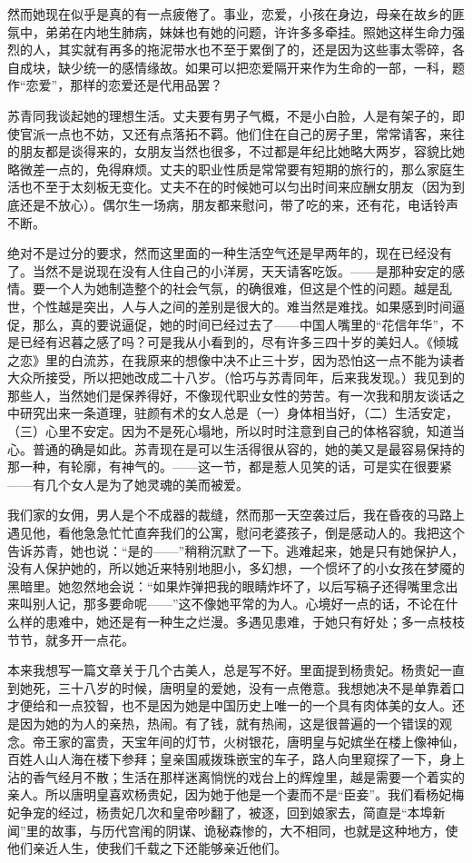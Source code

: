 \par 然而她现在似乎是真的有一点疲倦了。事业，恋爱，小孩在身边，母亲在故乡的匪氛中，弟弟在内地生肺病，妹妹也有她的问题，许许多多牵挂。照她这样生命力强烈的人，其实就有再多的拖泥带水也不至于累倒了的，还是因为这些事太零碎，各自成块，缺少统一的感情缘故。如果可以把恋爱隔开来作为生命的一部，一科，题作“恋爱”，那样的恋爱还是代用品罢？
\par 苏青同我谈起她的理想生活。丈夫要有男子气概，不是小白脸，人是有架子的，即使官派一点也不妨，又还有点落拓不羁。他们住在自己的房子里，常常请客，来往的朋友都是谈得来的，女朋友当然也很多，不过都是年纪比她略大两岁，容貌比她略微差一点的，免得麻烦。丈夫的职业性质是常常要有短期的旅行的，那么家庭生活也不至于太刻板无变化。丈夫不在的时候她可以匀出时间来应酬女朋友（因为到底还是不放心）。偶尔生一场病，朋友都来慰问，带了吃的来，还有花，电话铃声不断。
\par 绝对不是过分的要求，然而这里面的一种生活空气还是早两年的，现在已经没有了。当然不是说现在没有人住自己的小洋房，天天请客吃饭。——是那种安定的感情。要一个人为她制造整个的社会气氛，的确很难，但这是个性的问题。越是乱世，个性越是突出，人与人之间的差别是很大的。难当然是难找。如果感到时间逼促，那么，真的要说逼促，她的时间已经过去了——中国人嘴里的“花信年华”，不是已经有迟暮之感了吗？可是我从小看到的，尽有许多三四十岁的美妇人。《倾城之恋》里的白流苏，在我原来的想像中决不止三十岁，因为恐怕这一点不能为读者大众所接受，所以把她改成二十八岁。（恰巧与苏青同年，后来我发现。）我见到的那些人，当然她们是保养得好，不像现代职业女性的劳苦。有一次我和朋友谈话之中研究出来一条道理，驻颜有术的女人总是（一）身体相当好，（二）生活安定，（三）心里不安定。因为不是死心塌地，所以时时注意到自己的体格容貌，知道当心。普通的确是如此。苏青现在是可以生活得很从容的，她的美又是最容易保持的那一种，有轮廓，有神气的。——这一节，都是惹人见笑的话，可是实在很要紧——有几个女人是为了她灵魂的美而被爱。
\par 我们家的女佣，男人是个不成器的裁缝，然而那一天空袭过后，我在昏夜的马路上遇见他，看他急急忙忙直奔我们的公寓，慰问老婆孩子，倒是感动人的。我把这个告诉苏青，她也说：“是的——”稍稍沉默了一下。逃难起来，她是只有她保护人，没有人保护她的，所以她近来特别地胆小，多幻想，一个惯坏了的小女孩在梦魇的黑暗里。她忽然地会说：“如果炸弹把我的眼睛炸坏了，以后写稿子还得嘴里念出来叫别人记，那多要命呢——”这不像她平常的为人。心境好一点的话，不论在什么样的患难中，她还是有一种生之烂漫。多遇见患难，于她只有好处；多一点枝枝节节，就多开一点花。
\par 本来我想写一篇文章关于几个古美人，总是写不好。里面提到杨贵妃。杨贵妃一直到她死，三十八岁的时候，唐明皇的爱她，没有一点倦意。我想她决不是单靠着口才便给和一点狡智，也不是因为她是中国历史上唯一的一个具有肉体美的女人。还是因为她的为人的亲热，热闹。有了钱，就有热闹，这是很普遍的一个错误的观念。帝王家的富贵，天宝年间的灯节，火树银花，唐明皇与妃嫔坐在楼上像神仙，百姓人山人海在楼下参拜；皇亲国戚拨珠嵌宝的车子，路人向里窥探了一下，身上沾的香气经月不散；生活在那样迷离惝恍的戏台上的辉煌里，越是需要一个着实的亲人。所以唐明皇喜欢杨贵妃，因为她于他是一个妻而不是“臣妾”。我们看杨妃梅妃争宠的经过，杨贵妃几次和皇帝吵翻了，被逐，回到娘家去，简直是“本埠新闻”里的故事，与历代宫闱的阴谋、诡秘森惨的，大不相同，也就是这种地方，使他们亲近人生，使我们千载之下还能够亲近他们。

